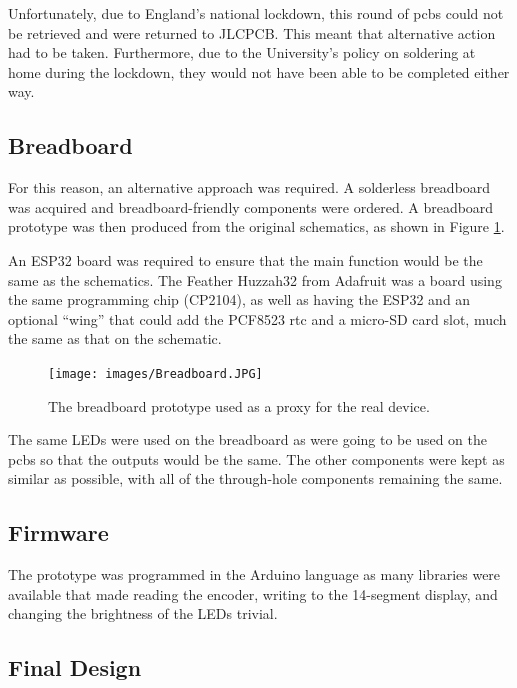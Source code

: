 Unfortunately, due to England's national lockdown, this round of \acrshort{pcbs} could not be retrieved and were returned to JLCPCB. This meant that alternative action had to be taken. Furthermore, due to the University's policy on soldering at home during the lockdown, they would not have been able to be completed either way.

\subsection{Breadboard}

For this reason, an alternative approach was required. A solderless breadboard was acquired and breadboard-friendly components were ordered. A breadboard prototype was then produced from the original schematics, as shown in Figure \ref{Fig:breadboard}.

An ESP32 board was required to ensure that the main function would be the same as the schematics. The Feather Huzzah32 from Adafruit was a board using the same programming chip (CP2104), as well as having the ESP32 and an optional ``wing'' that could add the PCF8523 \acrfull{rtc} and a micro-SD card slot, much the same as that on the schematic.

\begin{figure}[tb]
\centering
\texttt{[image: images/Breadboard.JPG]}
\caption{The breadboard prototype used as a proxy for the real device.}
\label{Fig:breadboard}
\end{figure}

The same LEDs were used on the breadboard as were going to be used on the \acrshort{pcbs} so that the outputs would be the same. The other components were kept as similar as possible, with all of the through-hole components remaining the same.

\subsection{Firmware}

The prototype was programmed in the Arduino language as many libraries were available that made reading the encoder, writing to the 14-segment display, and changing the brightness of the LEDs trivial.

\subsection{Final Design}

